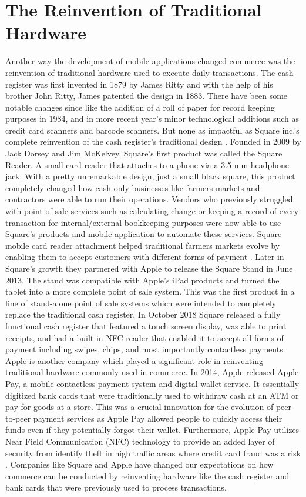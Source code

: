 \documentclass{article}
\begin{document}
\section{The Reinvention of Traditional Hardware}
Another way the development of mobile applications changed commerce was the reinvention of traditional hardware used to execute daily transactions. The cash register was first invented in 1879 by James Ritty and with the help of his brother John Ritty, James patented the design in 1883. There have been some notable changes since like the addition of a roll of paper for record keeping purposes in 1984, and in more recent year’s minor technological additions such as credit card scanners and barcode scanners. But none as impactful as Square inc.’s complete reinvention of the cash register’s traditional design \cite{sorensen_2019}.
Founded in 2009 by Jack Dorsey and Jim McKelvey, Square’s first product was called the Square Reader. A small card reader that attaches to a phone via a 3.5 mm headphone jack. With a pretty unremarkable design, just a small black square, this product completely changed how cash-only businesses like farmers markets and contractors were able to run their operations. Vendors who previously struggled with point-of-sale services such as calculating change or keeping a record of every transaction for internal/external bookkeeping purposes were now able to use Square’s products and mobile application to automate these services. Square mobile card reader attachment helped traditional farmers markets evolve by enabling them to accept customers with different forms of payment \cite{cussen_2020}. Later in Square's growth they partnered with Apple to release the Square Stand in June 2013. The stand was compatible with Apple's iPad products and turned the tablet into a more complete point of sale system. This was the first product in a line of stand-alone point of sale systems which were intended to completely replace the traditional cash register. In October 2018 Square released a fully functional cash register that featured a touch screen display, was able to print receipts, and had a built in NFC reader that enabled it to accept all forms of payment including swipes, chips, and most importantly contactless payments.
Apple is another company which played a significant role in reinventing traditional hardware commonly used in commerce. In 2014, Apple released Apple Pay, a mobile contactless payment system and digital wallet service. It essentially digitized bank cards that were traditionally used to withdraw cash at an ATM or pay for goods at a store. This was a crucial innovation for the evolution of peer-to-peer payment services as Apple Pay allowed people to quickly access their funds even if they potentially forgot their wallet. Furthermore, Apple Pay utilizes Near Field Communication (NFC) technology to provide an added layer of security from identify theft in high traffic areas where credit card fraud was a risk \cite{larkin_2020}. Companies like Square and Apple have changed our expectations on how commerce can be conducted by reinventing hardware like the cash register and bank cards that were previously used to process transactions.
\end{document}
